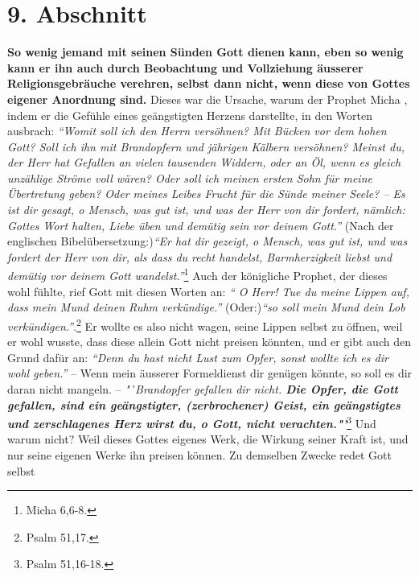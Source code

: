 \section{9. Abschnitt} \label{kap6_ab9}

\label{ref:06_09_gottesregeln}
\textbf{So wenig jemand mit seinen Sünden Gott dienen kann, eben so wenig kann
er ihn
auch durch Beobachtung und Vollziehung äusserer Religionsgebräuche verehren,
selbst dann nicht, wenn diese von Gottes eigener Anordnung sind.}
Dieses war die
Ursache, warum der Prophet Micha , indem er die Gefühle
eines geängstigten
Herzens darstellte, in den Worten ausbrach:
\textit{"`Womit soll ich den Herrn versöhnen? Mit Bücken vor dem hohen Gott?
Soll ich ihn mit Brandopfern und jährigen Kälbern versöhnen? Meinst du, der
Herr hat Gefallen an vielen tausenden Widdern, oder an Öl, wenn es gleich
unzählige Ströme voll wären? Oder soll ich meinen ersten Sohn für meine
Übertretung geben? Oder meines Leibes Frucht für die Sünde meiner Seele? -- Es
ist dir gesagt, o Mensch, was gut ist, und was der Herr von dir fordert,
nämlich: Gottes Wort halten, Liebe üben und demütig sein vor deinem Gott."'}
(Nach der englischen Bibelübersetzung:)\textit{"`Er hat dir gezeigt,
o Mensch, was gut ist, und was fordert der Herr von dir, als dass du recht
handelst, Barmherzigkeit liebst und demütig vor deinem Gott
wandelst."'}\footnote{Micha 6,6-8.}
Auch der königliche Prophet, der dieses
wohl fühlte, rief Gott mit diesen Worten an:
\textit{"` O Herr! Tue du meine Lippen auf,
dass mein Mund deinen Ruhm verkündige."'} (Oder:)\textit{"`so soll mein Mund
dein Lob
verkündigen."'}.\footnote{Psalm 51,17.}
Er wollte es also nicht wagen,
seine Lippen selbst zu öffnen, weil er wohl wusste, dass diese allein Gott
nicht preisen könnten, und er gibt auch den Grund dafür an:
\textit{"`Denn du hast
nicht Lust zum Opfer, sonst wollte ich es dir wohl geben."'} -- Wenn mein
äusserer Formeldienst dir genügen könnte, so soll es dir daran nicht mangeln.
--
\textit{"`Brandopfer  gefallen dir nicht. \textbf{Die Opfer,
die Gott gefallen, sind ein geängstigter, (zerbrochener) Geist, ein
geängstigtes und zerschlagenes Herz wirst du, o Gott, nicht
verachten."'}}\footnote{Psalm 51,16-18.}
Und warum
nicht? Weil dieses Gottes eigenes Werk, die Wirkung seiner Kraft ist, und nur
seine eigenen Werke ihn preisen können. Zu demselben Zwecke redet Gott selbst
